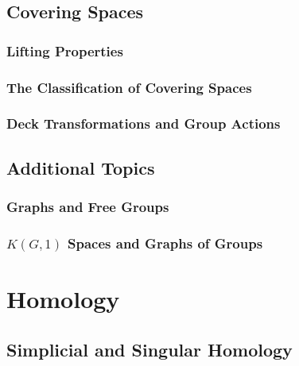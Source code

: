 \documentclass[11pt, a4paper]{article}
\begin{document}
\subsection{Covering Spaces}

\subsubsection{Lifting Properties}

\subsubsection{The Classification of Covering Spaces}

\subsubsection{Deck Transformations and Group Actions}

\subsection*{Additional Topics}

\subsubsection{Graphs and Free Groups}

\subsubsection{$K(G,1)$ Spaces and Graphs of Groups}

\section{Homology}

\subsection{Simplicial and Singular Homology}
\end{document}
